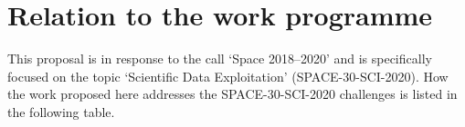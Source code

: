 %


\section{Relation to the work programme}
\label{sec:relation-to-work-programme}

This proposal is in response to the call `Space 2018--2020' and is specifically focused on the topic `Scientific Data Exploitation' (SPACE-30-SCI-2020). How the work proposed here addresses the SPACE-30-SCI-2020 challenges is listed in the following table.

